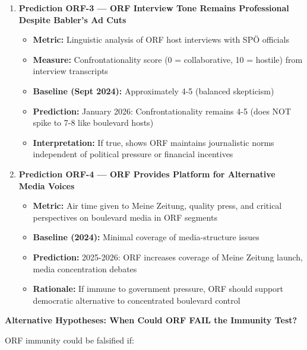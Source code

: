 \begin{enumerate}
\item \textbf{Prediction ORF-3 — ORF Interview Tone Remains Professional Despite Babler's Ad Cuts}
  \begin{itemize}
  \item \textbf{Metric:} Linguistic analysis of ORF host interviews with SPÖ officials
  \item \textbf{Measure:} Confrontationality score (0 = collaborative, 10 = hostile) from interview transcripts
  \item \textbf{Baseline (Sept 2024):} Approximately 4-5 (balanced skepticism)
  \item \textbf{Prediction:} January 2026: Confrontationality remains 4-5 (does NOT spike to 7-8 like boulevard hosts)
  \item \textbf{Interpretation:} If true, shows ORF maintains journalistic norms independent of political
    pressure or financial incentives
  \end{itemize}

\item \textbf{Prediction ORF-4 — ORF Provides Platform for Alternative Media Voices}
  \begin{itemize}
  \item \textbf{Metric:} Air time given to Meine Zeitung, quality press, and critical perspectives on
    boulevard media in ORF segments
  \item \textbf{Baseline (2024):} Minimal coverage of media-structure issues
  \item \textbf{Prediction:} 2025-2026: ORF increases coverage of Meine Zeitung launch, media concentration debates
  \item \textbf{Rationale:} If immune to government pressure, ORF should support democratic alternative to
    concentrated boulevard control
  \end{itemize}

\end{enumerate}

\textbf{Alternative Hypotheses: When Could ORF FAIL the Immunity Test?}

ORF immunity could be falsified if:

